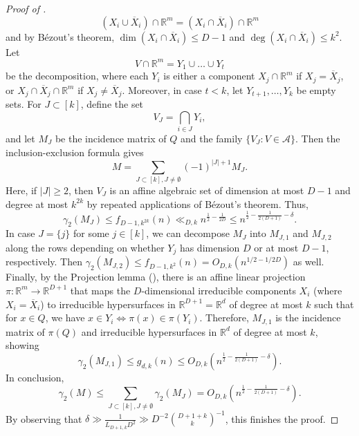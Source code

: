 \documentclass[10pt,a4paper]{amsart}
\begin{document}
\begin{proof}[Proof of ]
		$$(X_i\cup \overline{X}_i)\cap \mathbb{R}^m=(X_i\cap \overline{X}_i)\cap \mathbb{R}^m$$
		and by B\'ezout's theorem, $\dim(X_i\cap \overline{X}_i)\leq D-1$ and $\deg(X_i\cap \overline{X}_i)\leq k^2$. Let 
		$$V\cap \mathbb{R}^m=Y_1\cup\dots\cup Y_t$$ be the decomposition, where each $Y_i$ is either a component $X_j\cap \mathbb{R}^m$ if $X_j=\overline{X}_j$, or $X_j\cap \overline{X}_j\cap \mathbb{R}^m$ if $X_j\neq \overline{X}_j$. Moreover, in case $t<k$, let $Y_{t+1},\dots,Y_{k}$ be empty sets. For $J\subset [k]$, define the set 
		$$V_J=\bigcap_{i\in J}Y_i,$$
		and let $M_J$ be the incidence matrix of $Q$ and the family $\{V_J: V\in \mathcal{A}\}$. Then the inclusion-exclusion formula gives
		$$M=\sum_{J\subset [k], J\neq \emptyset} (-1)^{|J|+1} M_J.$$
		Here, if $|J|\geq 2$, then $V_J$ is an affine algebraic set of dimension at most $D-1$ and degree at most $k^{2k}$ by repeated applications of B\'ezout's theorem. Thus, 
        $$\gamma_2(M_J)\leq f_{D-1,k^{2k}}(n)\ll_{D,k} n^{\frac{1}{2}-\frac{1}{2D}}\leq  n^{\frac{1}{2}-\frac{1}{2(D+1)}-\delta}.$$ In case $J=\{j\}$ for some $j\in [k]$, we can decompose $M_J$ into $M_{J,1}$ and $M_{J,2}$ along the rows depending on whether $Y_j$ has dimension $D$ or at most $D-1$, respectively. Then $\gamma_2(M_{J,2})\leq f_{D-1,k^2}(n)=O_{D,k}(n^{1/2-1/2D})$ as well. Finally, by the Projection lemma (), there is an affine linear projection $\pi:\mathbb{R}^m\rightarrow\mathbb{R}^{D+1}$ that maps the $D$-dimensional irreducible components $X_i$ (where $X_i=\overline{X}_i$) to irreducible hypersurfaces in $\mathbb{R}^{D+1}=\mathbb{R}^d$ of degree at most $k$ such that for $x\in Q$, we have $x\in Y_i\iff \pi(x)\in \pi(Y_i)$. Therefore, $M_{J,1}$ is the incidence matrix of $\pi(Q)$ and irreducible hypersurfaces in $\mathbb{R}^{d}$ of degree at most $k$, showing $$\gamma_2(M_{J,1})\leq g_{d,k}(n)\leq O_{D,k}\left(n^{\frac{1}{2}-\frac{1}{2(D+1)}-\delta}\right).$$
		In conclusion,
		$$\gamma_2(M)\leq \sum_{J\subset [k], J\neq \emptyset} \gamma_2(M_J)= O_{D,k}\left( n^{\frac{1}{2}-\frac{1}{2(D+1)}-\delta}\right).$$
		By observing that  $\delta\gg \frac{1}{L_{D+1,k} D^{2}}\gg D^{-2}\binom{D+1+k}{k}^{-1}$, this finishes the proof.
	\end{proof}
\end{document}
